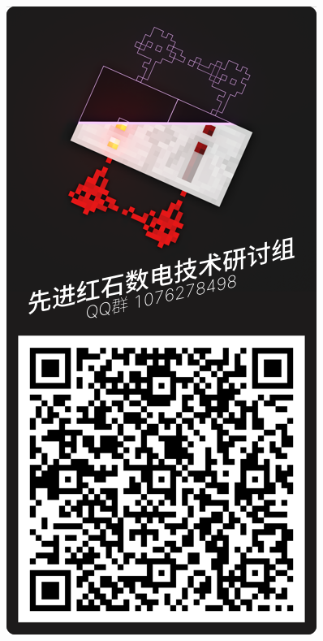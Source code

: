 \documentclass[UTF8,12pt,punct=kaiming,fontset=none]{ctexart}
\begin{document}
\thispagestyle{fancy}
\quad

\begin{figure}
    \vspace{-3.5cm}
    \includegraphics[width=\linewidth]{qrcode.png}
\end{figure}
\end{document}
